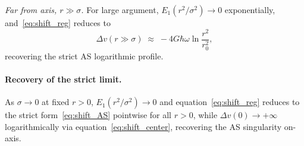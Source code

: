 \medskip
\noindent\textit{Far from axis, $r \gg \sigma$.}\;
For large argument, $E_1(r^2/\sigma^2) \to 0$ exponentially, 
and~\eqref{eq:shift_reg} reduces to
%
\begin{equation}
    \Delta v(r \gg \sigma) 
    \;\approx\; -4G\hbar\omega\ln\frac{r^2}{r_0^2},
    \label{eq:shift_AS}
\end{equation}
%
recovering the strict AS logarithmic profile.

\paragraph{Recovery of the strict limit.}
As $\sigma \to 0$ at fixed $r > 0$, $E_1(r^2/\sigma^2) \to 0$ 
and equation~\eqref{eq:shift_reg} reduces to the strict 
form~\eqref{eq:shift_AS} pointwise for all $r > 0$, while 
$\Delta v(0) \to +\infty$ logarithmically via 
equation~\eqref{eq:shift_center}, recovering the AS singularity 
on-axis.
